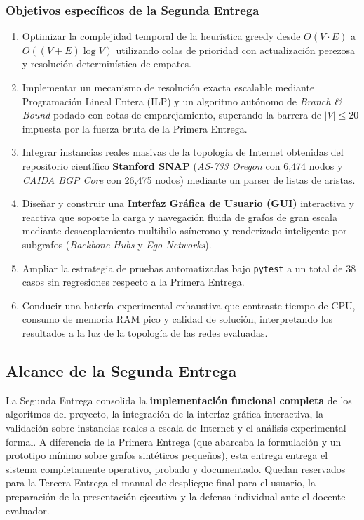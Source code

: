 \documentclass[11pt,a4paper]{article}
\begin{document}
\subsubsection*{Objetivos específicos de la Segunda Entrega}
\begin{enumerate}[itemsep=2pt]
	\item Optimizar la complejidad temporal de la heurística greedy desde $O(V \cdot E)$ a $O((V+E)\log V)$ utilizando colas de prioridad con actualización perezosa y resolución determinística de empates.
	\item Implementar un mecanismo de resolución exacta escalable mediante Programación Lineal Entera (ILP) y un algoritmo autónomo de \textit{Branch \& Bound} podado con cotas de emparejamiento, superando la barrera de $|V| \le 20$ impuesta por la fuerza bruta de la Primera Entrega.
	\item Integrar instancias reales masivas de la topología de Internet obtenidas del repositorio científico \textbf{Stanford SNAP} (\textit{AS-733 Oregon} con 6,474 nodos y \textit{CAIDA BGP Core} con 26,475 nodos) mediante un parser de listas de aristas.
	\item Diseñar y construir una \textbf{Interfaz Gráfica de Usuario (GUI)} interactiva y reactiva que soporte la carga y navegación fluida de grafos de gran escala mediante desacoplamiento multihilo asíncrono y renderizado inteligente por subgrafos (\textit{Backbone Hubs} y \textit{Ego-Networks}).
	\item Ampliar la estrategia de pruebas automatizadas bajo \texttt{pytest} a un total de 38 casos sin regresiones respecto a la Primera Entrega.
	\item Conducir una batería experimental exhaustiva que contraste tiempo de CPU, consumo de memoria RAM pico y calidad de solución, interpretando los resultados a la luz de la topología de las redes evaluadas.
\end{enumerate}

\subsection{Alcance de la Segunda Entrega}
La Segunda Entrega consolida la \textbf{implementación funcional completa} de los algoritmos del proyecto, la integración de la interfaz gráfica interactiva, la validación sobre instancias reales a escala de Internet y el análisis experimental formal. A diferencia de la Primera Entrega (que abarcaba la formulación y un prototipo mínimo sobre grafos sintéticos pequeños), esta entrega entrega el sistema completamente operativo, probado y documentado. Quedan reservados para la Tercera Entrega el manual de despliegue final para el usuario, la preparación de la presentación ejecutiva y la defensa individual ante el docente evaluador.
\end{document}

